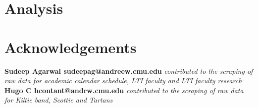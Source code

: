 \documentclass[11pt]{article}
\begin{document}




\section{Analysis}

\clearpage
\section*{Acknowledgements}

\textbf{Sudeep Agarwal sudeepag@andreew.cmu.edu} \textit{contributed to the scraping of raw data for academic calendar schedule, LTI faculty and LTI faculty research}
\\
\textbf{Hugo C hcontant@andrw.cmu.edu} \textit{contributed to the scraping of raw data for Kiltie band, Scottie and Tartans}


\end{document}
